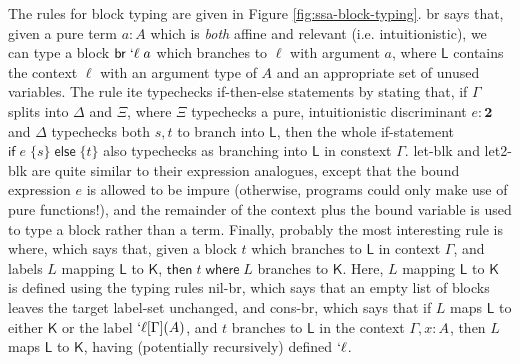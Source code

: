 \documentclass[acmsmall,screen,review]{acmart}
\newcommand{\mb}[1]{\ensuremath{\mathbf{#1}}}
\newcommand{\ms}[1]{\ensuremath{\mathsf{#1}}}
\newcommand{\lbl}[1]{{`#1}}
\newcommand{\brb}[2]{\ms{br}\;#1\;#2}
\newcommand{\lbrb}[2]{\brb{\lbl{#1}}{#2}}
\newcommand{\ite}[3]{\ms{if}\;#1\;\{#2\}\;\ms{else}\;\{#3\}}
\newcommand{\ewhere}[2]{\ms{then}\;#1\;\ms{where}\;#2}
\newcommand{\thyp}[3]{#1: {#2}^{#3}}
\newcommand{\rle}[1]{{\scriptsize\textsf{#1}}}
\begin{document}
The rules for block typing are given in Figure \ref{fig:ssa-block-typing}.
\rle{br} says that, given a pure term \(a: A\) which is \textit{both} affine and
relevant (i.e. intuitionistic), we can type a block \(\lbrb{\ell}{a}\) which
branches to \(\ell\) with argument \(a\), where \(\ms{L}\) contains the context
\(\ell\) with an argument type of \(A\) and an appropriate set of unused
variables. The rule \rle{ite} typechecks if-then-else statements by stating
that, if \(\Gamma\) splits into \(\Delta\) and \(\Xi\), where \(\Xi\) typechecks
a pure, intuitionistic discriminant \(e: \mb{2}\) and \(\Delta\) typechecks both
\(s, t\) to branch into \(\ms{L}\), then the whole if-statement
\(\ite{e}{s}{t}\) also typechecks as branching into \(\ms{L}\) in constext
\(\Gamma\). \rle{let-blk} and \rle{let2-blk} are quite similar to their
expression analogues, except that the bound expression \(e\) is allowed to be
impure (otherwise, programs could only make use of pure functions!), and the
remainder of the context plus the bound variable is used to type a block rather
than a term. Finally, probably the most interesting rule is \rle{where}, which
says that, given a block \(t\) which branches to \(\ms{L}\) in context
\(\Gamma\), and labels \(L\) mapping \(\ms{L}\) to \(\ms{K}\), \(\ewhere{t}{L}\)
branches to \(\ms{K}\). Here, \(L\) mapping \(\ms{L}\) to \(\ms{K}\) is defined
using the typing rules \rle{nil-br}, which says that an empty list of blocks
leaves the target label-set unchanged, and \rle{cons-br}, which says that if
\(L\) maps \(\ms{L}\) to either \(\ms{K}\) or the label
\(\lbl{\ell}[\Gamma](A)\), and \(t\) branches to \(\ms{L}\) in the context
\(\Gamma, \thyp{x}{A}{}\), then \(L\) maps \(\ms{L}\) to \(\ms{K}\), having
(potentially recursively) defined \(\lbl{\ell}\).
\end{document}
